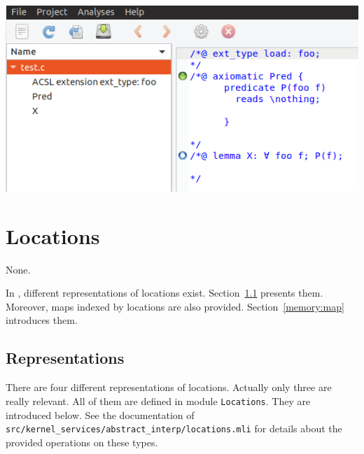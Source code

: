 \includegraphics[width=\textwidth]{examples/acsl_extension_ext_types}




\section{Locations}\label{adv:memory}

\begin{prereq}
  None.
\end{prereq}

In \framac, different representations of \C locations
exist. Section~\ref{memory:repr} presents them. Moreover, maps indexed by
locations are also provided. Section~\ref{memory:map} introduces them.

\subsection{Representations}\label{memory:repr}

There are four different representations of \C locations. Actually only three
are really relevant. All of them are defined in module
\texttt{Locations}. They are introduced below. See the
documentation of \texttt{src/kernel\_services/abstract\_interp/locations.mli}
for details about the provided operations on these types.

